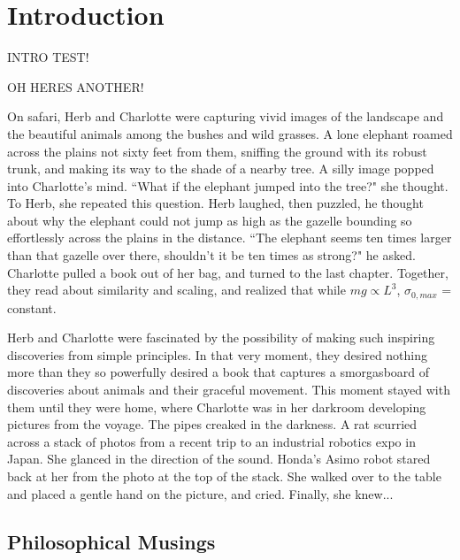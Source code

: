 \chapter{Introduction}
\label{sec:Introduction}

INTRO TEST!

OH HERES ANOTHER!

On safari, Herb and Charlotte were capturing vivid images of the landscape and the beautiful animals among the bushes and wild grasses. A lone elephant roamed across the plains not sixty feet from them, sniffing the ground with its robust trunk, and making its way to the shade of a nearby tree. A silly image popped into Charlotte's mind. ``What if the elephant jumped into the tree?" she thought. To Herb, she repeated this question. Herb laughed, then puzzled, he thought about why the elephant could not jump as high as the gazelle bounding so effortlessly across the plains in the distance. ``The elephant seems ten times larger than that gazelle over there, shouldn't it be ten times as strong?" he asked. Charlotte pulled a book \cite{mcmahon84} out of her bag, and turned to the last chapter. Together, they read about similarity and scaling, and realized that while $mg \propto L^{3}$, $\sigma_{0, max}$ = constant.

Herb and Charlotte were fascinated by the possibility of making such inspiring discoveries from simple principles. In that very moment, they desired nothing more than they so powerfully desired a book that captures a smorgasboard of discoveries about animals and their graceful movement. This moment stayed with them until they were home, where Charlotte was in her darkroom developing pictures from the voyage. The pipes creaked in the darkness. A rat scurried across a stack of photos from a recent trip to an industrial robotics expo in Japan. She glanced in the direction of the sound. Honda's Asimo robot stared back at her from the photo at the top of the stack. She walked over to the table and placed a gentle hand on the picture, and cried. Finally, she knew...

\section{Philosophical Musings}

